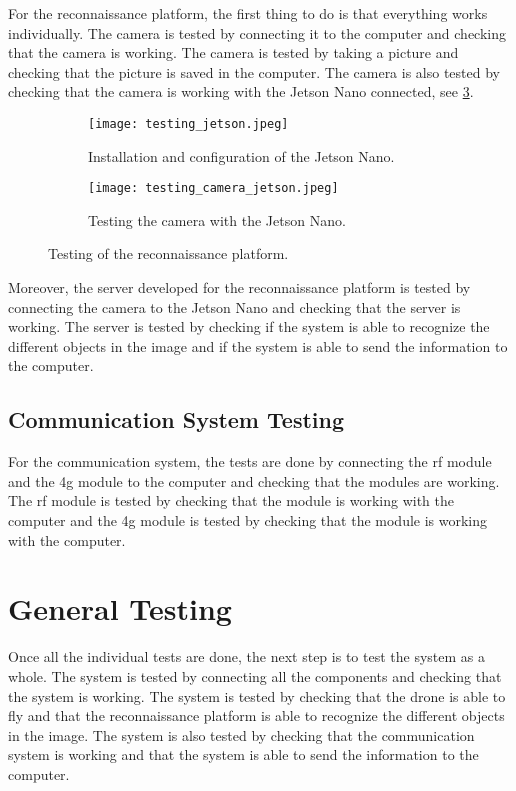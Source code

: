 For the reconnaissance platform, the first thing to do is that everything works individually. The camera is tested by connecting it to the computer and checking that the camera is working. The camera is tested by taking a picture and checking that the picture is saved in the computer. The camera is also tested by checking that the camera is working with the Jetson Nano connected, see \cref{fig:reconnaissance_platform_testing}.

\begin{figure}
	\hfill
	\begin{subfigure}{0.4\textwidth}
		\texttt{[image: testing\_jetson.jpeg]}
		\caption{Installation and configuration of the Jetson Nano.}\label{fig:jetson_testing}
	\end{subfigure}
	\hfill
	\begin{subfigure}{0.4\textwidth}
		\texttt{[image: testing\_camera\_jetson.jpeg]}
		\caption{Testing the camera with the Jetson Nano.}\label{fig:jetson_camera_testing}
	\end{subfigure}
	\hfill

	\caption{Testing of the reconnaissance platform.}\label{fig:reconnaissance_platform_testing}
\end{figure}

Moreover, the server developed for the reconnaissance platform is tested by connecting the camera to the Jetson Nano and checking that the server is working. The server is tested by checking if the system is able to recognize the different objects in the image and if the system is able to send the information to the computer.

\subsection{Communication System Testing}\label{subsec:communication_system_testing}

For the communication system, the tests are done by connecting the \gls{rf} module and the \gls{4g} module to the computer and checking that the modules are working. The \gls{rf} module is tested by checking that the module is working with the computer and the \gls{4g} module is tested by checking that the module is working with the computer.

\section{General Testing}\label{sec:general_testing}

Once all the individual tests are done, the next step is to test the system as a whole. The system is tested by connecting all the components and checking that the system is working. The system is tested by checking that the drone is able to fly and that the reconnaissance platform is able to recognize the different objects in the image. The system is also tested by checking that the communication system is working and that the system is able to send the information to the computer.

